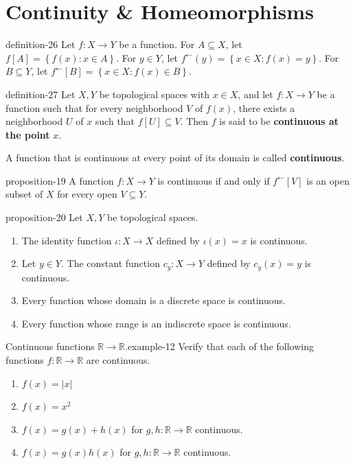 \documentclass[10pt,]{article}
\newcommand{\terminology}[1]{\textbf{#1}}
\newcommand{\mb}{\mathbb}
\newcommand{\setBuilder}[2]{\left\{#1:#2\right\}}
\begin{document}
\section[{Continuity \& Homeomorphisms}]{Continuity \& Homeomorphisms}\label{section-continuity}
\begin{definition}{}{definition-26}%
\hypertarget{p-88}{}%
Let \(f:X\to Y\) be a function. For \(A\subseteq X\), let \(f[A]=\setBuilder{f(x)}{x\in A}\). For \(y\in Y\), let \(f^\leftarrow(y)=\setBuilder{x\in X}{f(x)=y}\). For \(B\subseteq Y\), let \(f^\leftarrow[B]=\setBuilder{x\in X}{f(x)\in B}\).%
\end{definition}
\begin{definition}{}{definition-27}%
\hypertarget{p-89}{}%
Let \(X,Y\) be topological spaces with \(x\in X\), and let \(f:X\to Y\) be a function such that for every neighborhood \(V\) of \(f(x)\), there exists a neighborhood \(U\) of \(x\) such that \(f[U]\subseteq V\). Then \(f\) is said to be \terminology{continuous at the point} \(x\).%
\par
\hypertarget{p-90}{}%
A function that is continuous at every point of its domain is called \terminology{continuous}.%
\end{definition}
\begin{proposition}{}{}{proposition-19}%
\hypertarget{p-91}{}%
A function \(f:X\to Y\) is continuous if and only if \(f^\leftarrow[V]\) is an open subset of \(X\) for every open \(V\subseteq Y\).%
\end{proposition}
\begin{proposition}{}{}{proposition-20}%
\hypertarget{p-92}{}%
Let \(X,Y\) be topological spaces.%
\leavevmode%
\begin{enumerate}
\item\hypertarget{li-80}{}The identity function \(\iota:X\to X\) defined by \(\iota(x)=x\) is continuous.%
\item\hypertarget{li-81}{}Let \(y\in Y\). The constant function \(c_y:X\to Y\) defined by \(c_y(x)=y\) is continuous.%
\item\hypertarget{li-82}{}Every function whose domain is a discrete space is continuous.%
\item\hypertarget{li-83}{}Every function whose range is an indiscrete space is continuous.%
\end{enumerate}
\end{proposition}
\begin{example}{Continuous functions \(\mb R\to\mb R\).}{example-12}%
\hypertarget{p-93}{}%
Verify that each of the following functions \(f:\mb R\to\mb R\) are continuous.%
\leavevmode%
\begin{enumerate}
\item\hypertarget{li-84}{}\(f(x)=|x|\)%
\item\hypertarget{li-85}{}\(f(x)=x^2\)%
\item\hypertarget{li-86}{}\(f(x)=g(x)+h(x)\) for \(g,h:\mb R\to\mb R\) continuous.%
\item\hypertarget{li-87}{}\(f(x)=g(x)h(x)\) for \(g,h:\mb R\to\mb R\) continuous.%
\end{enumerate}
\end{example}
\end{document}
